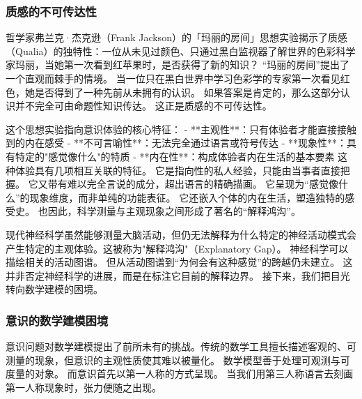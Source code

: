 \subsubsection{质感的不可传达性}

哲学家弗兰克·杰克逊（Frank Jackson）的「玛丽的房间」思想实验揭示了质感（Qualia）的独特性：一位从未见过颜色、只通过黑白监视器了解世界的色彩科学家玛丽，当她第一次看到红苹果时，是否获得了新的知识？
“玛丽的房间”提出了一个直观而棘手的情境。
当一位只在黑白世界中学习色彩学的专家第一次看见红色，她是否得到了一种先前从未拥有的认识。
如果答案是肯定的，那么这部分认识并不完全可由命题性知识传达。
这正是质感的不可传达性。

这个思想实验指向意识体验的核心特征：
- **主观性**：只有体验者才能直接接触到的内在感受
- **不可言喻性**：无法完全通过语言或符号传达
- **现象性**：具有特定的"感觉像什么"的特质
- **内在性**：构成体验者内在生活的基本要素
这种体验具有几项相互关联的特征。
它是指向性的私人经验，只能由当事者直接把握。
它又带有难以完全言说的成分，超出语言的精确描画。
它呈现为“感觉像什么”的现象维度，而非单纯的功能表征。
它还嵌入个体的内在生活，塑造独特的感受史。
也因此，科学测量与主观现象之间形成了著名的“解释鸿沟”。

现代神经科学虽然能够测量大脑活动，但仍无法解释为什么特定的神经活动模式会产生特定的主观体验。这被称为"解释鸿沟"（Explanatory Gap）。
神经科学可以描绘相关的活动图谱。
但从活动图谱到“为何会有这种感觉”的跨越仍未建立。
这并非否定神经科学的进展，而是在标注它目前的解释边界。
接下来，我们把目光转向数学建模的困境。



\subsubsection{意识的数学建模困境}

意识问题对数学建模提出了前所未有的挑战。传统的数学工具擅长描述客观的、可测量的现象，但意识的主观性质使其难以被量化。
数学模型善于处理可观测与可度量的对象。
而意识首先以第一人称的方式呈现。
当我们用第三人称语言去刻画第一人称现象时，张力便随之出现。

